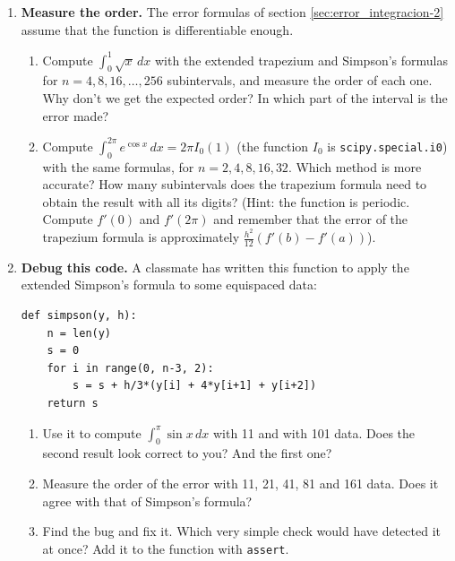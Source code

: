 \begin{enumerate}
\item \label{ej:orden_int-en} \textbf{Measure the order.} The error formulas of section \ref{sec:error_integracion-2} assume that the function is differentiable enough.
\begin{enumerate}
\item Compute $\int_0^1\sqrt{x}\,dx$ with the extended trapezium and Simpson's formulas for $n=4,8,16,\dots,256$ subintervals, and measure the order of each one. Why don't we get the expected order? In which part of the interval is the error made?
\item Compute $\int_0^{2\pi}e^{\cos x}\,dx=2\pi I_0(1)$ (the function $I_0$ is \texttt{scipy.special.i0}) with the same formulas, for $n=2,4,8,16,32$. Which method is more accurate? How many subintervals does the trapezium formula need to obtain the result with all its digits? (Hint: the function is periodic. Compute $f'(0)$ and $f'(2\pi)$ and remember that the error of the trapezium formula is approximately $\frac{h^2}{12}\left(f'(b)-f'(a)\right)$).
\end{enumerate}

\item \label{ej:depura_simpson-en} \textbf{Debug this code.} A classmate has written this function to apply the extended Simpson's formula to some equispaced data:
\begin{verbatim}
def simpson(y, h):
    n = len(y)
    s = 0
    for i in range(0, n-3, 2):
        s = s + h/3*(y[i] + 4*y[i+1] + y[i+2])
    return s
\end{verbatim}
\begin{enumerate}
\item Use it to compute $\int_0^\pi\sin x\,dx$ with 11 and with 101 data. Does the second result look correct to you? And the first one?
\item Measure the order of the error with 11, 21, 41, 81 and 161 data. Does it agree with that of Simpson's formula?
\item Find the bug and fix it. Which very simple check would have detected it at once? Add it to the function with \texttt{assert}.
\end{enumerate}


\end{enumerate}
